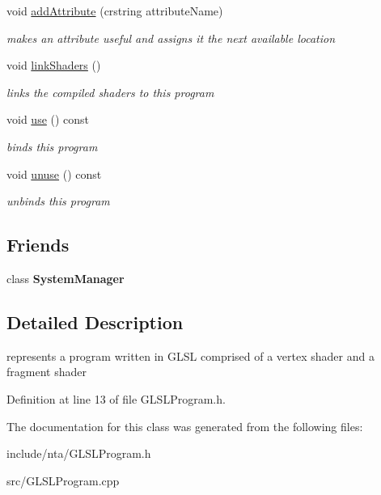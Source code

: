 \begin{DoxyCompactItemize}
void \hyperlink{classnta_1_1GLSLProgram_a708c47abebb9ca01b0eed4d1e711cef7}{add\+Attribute} (crstring attribute\+Name)
\begin{DoxyCompactList}\small\item\em makes an attribute useful and assigns it the next available location \end{DoxyCompactList}\item 
\mbox{\label{classnta_1_1GLSLProgram_aa1d946246f4b04ba0b947362152ec1c0}} 
void \hyperlink{classnta_1_1GLSLProgram_aa1d946246f4b04ba0b947362152ec1c0}{link\+Shaders} ()
\begin{DoxyCompactList}\small\item\em links the compiled shaders to this program \end{DoxyCompactList}\item 
\mbox{\label{classnta_1_1GLSLProgram_ac5c8fffb04aec82913b78e35db9ea31f}} 
void \hyperlink{classnta_1_1GLSLProgram_ac5c8fffb04aec82913b78e35db9ea31f}{use} () const
\begin{DoxyCompactList}\small\item\em binds this program \end{DoxyCompactList}\item 
\mbox{\label{classnta_1_1GLSLProgram_a3153b4281ab2b6fcf0017c90bbd199af}} 
void \hyperlink{classnta_1_1GLSLProgram_a3153b4281ab2b6fcf0017c90bbd199af}{unuse} () const
\begin{DoxyCompactList}\small\item\em unbinds this program \end{DoxyCompactList}\end{DoxyCompactItemize}
\subsection*{Friends}
\begin{DoxyCompactItemize}
\item 
\mbox{\label{classnta_1_1GLSLProgram_ab1ef2aa9992dd8ae85793e1a1f980e1e}} 
class {\bfseries System\+Manager}
\end{DoxyCompactItemize}


\subsection{Detailed Description}
represents a program written in G\+L\+SL comprised of a vertex shader and a fragment shader 

Definition at line 13 of file G\+L\+S\+L\+Program.\+h.



The documentation for this class was generated from the following files\+:\begin{DoxyCompactItemize}
\item 
include/nta/G\+L\+S\+L\+Program.\+h\item 
src/G\+L\+S\+L\+Program.\+cpp\end{DoxyCompactItemize}
